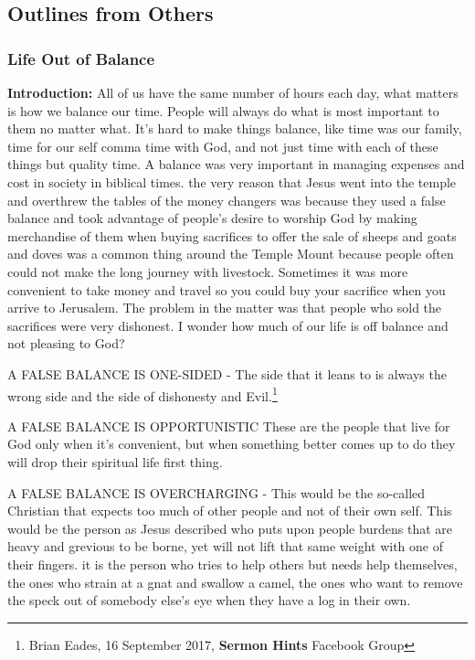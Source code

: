 \subsection{Outlines from Others}

\subsubsection{Life Out of Balance}


\textbf{Introduction:} All of us have the same number of hours each day, what matters is how we balance our time. People will always do what is most important to them no matter what. It's hard to make things balance, like time was our family, time for our self comma time with God, and not just time with each of these things but quality time. A balance was very important in managing expenses and cost in society in biblical times. the very reason that Jesus went into the temple and overthrew the tables of the money changers was because they used a false balance and took advantage of people's desire to worship God by making merchandise of them when buying sacrifices to offer the sale of sheeps and goats and doves was a common thing around the Temple Mount because people often could not make the long journey with livestock. Sometimes it was more convenient to take money and travel so you could buy your sacrifice when you arrive to Jerusalem. The problem in the matter was that people who sold the sacrifices were very dishonest. I wonder how much of our life is off balance and not pleasing to God?
\begin{compactenum}[I.]
    \item A FALSE BALANCE IS ONE-SIDED - The side that it leans to is always the wrong side and the side of dishonesty and Evil.\footnote{Brian Eades, 16 September 2017, \textbf{Sermon Hints} Facebook Group}
    \item A FALSE BALANCE IS OPPORTUNISTIC These are the people that live for God only when it's convenient, but when something better comes up to do they will drop their spiritual life first thing.
    \item A FALSE BALANCE IS OVERCHARGING - This would be the so-called Christian that expects too much of other people and not of their own self. This would be the person as Jesus described who puts upon people burdens that are heavy and grevious to be borne, yet will not lift that same weight with one of their fingers. it is the person who tries to help others but needs help themselves, the ones who strain at a gnat and swallow a camel, the ones who want to remove the speck out of somebody else's eye when they have a log in their own.
\end{compactenum}


